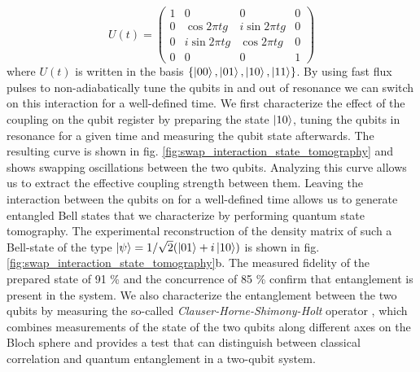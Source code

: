 \begin{equation}
	U(t)  =  \left( \begin{array}{cccc} 1 & 0 & 0 & 0 \\ 0 & \cos{2 \pi t g} & i\sin{2 \pi t g} & 0 \\ 0 & i\sin{2 \pi t g} & \cos{2 \pi t g} & 0 \\ 0 & 0 & 0 & 1 \end{array} \right) \label{eq:swap_evolution_operator}
\end{equation}
 where $U(t)$ is written in the basis $\{\left| 00 \right>,\left| 01 \right>,\left| 10 \right>,\left| 11 \right>\}$. By using fast flux pulses to non-adiabatically tune the qubits in and out of resonance we can switch on this interaction for a well-defined time. We first characterize the effect of the coupling on the qubit register by preparing the state $\left| 10 \right>$, tuning the qubits in resonance for a given time and measuring the  qubit state afterwards. The resulting curve is shown in fig. \ref{fig:swap_interaction_state_tomography} and   shows swapping  oscillations between the two qubits. Analyzing this curve allows us to extract the effective coupling strength between them. Leaving the interaction between the qubits on for a well-defined time allows us to generate entangled Bell states that we characterize by performing quantum state tomography. The experimental reconstruction of the density matrix of such a Bell-state of the type $\left| \psi \right> = 1/\sqrt{2}(\left| 01 \right>+i\left| 10 \right>)$ is shown in fig. \ref{fig:swap_interaction_state_tomography}b. The measured fidelity of the prepared state of 91 \% and the concurrence of 85 \% confirm that entanglement is present in the system. We also characterize the entanglement between the two qubits by measuring the so-called {\it Clauser-Horne-Shimony-Holt} operator \citep{clauser_proposed_1969}, which combines measurements of the state of the two qubits along different axes on the Bloch sphere and provides a test that can distinguish between classical correlation and quantum entanglement in a two-qubit system.

